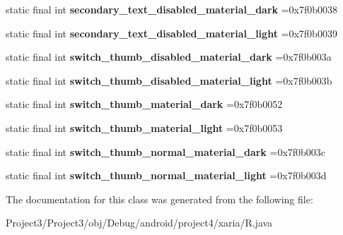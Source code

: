 \begin{DoxyCompactItemize}
static final int {\bfseries secondary\+\_\+text\+\_\+disabled\+\_\+material\+\_\+dark} =0x7f0b0038
\item 
\mbox{\label{classproject4_1_1xaria_1_1R_1_1color_aa8acd560167c8da622b855f6faadcd74}} 
static final int {\bfseries secondary\+\_\+text\+\_\+disabled\+\_\+material\+\_\+light} =0x7f0b0039
\item 
\mbox{\label{classproject4_1_1xaria_1_1R_1_1color_af5c1c168d6208d5efd3ebbaf8b90255c}} 
static final int {\bfseries switch\+\_\+thumb\+\_\+disabled\+\_\+material\+\_\+dark} =0x7f0b003a
\item 
\mbox{\label{classproject4_1_1xaria_1_1R_1_1color_ad959604f4ca8ac6d23ec45c8bb16be19}} 
static final int {\bfseries switch\+\_\+thumb\+\_\+disabled\+\_\+material\+\_\+light} =0x7f0b003b
\item 
\mbox{\label{classproject4_1_1xaria_1_1R_1_1color_ae33f71580a9b90cb476a54a52b7e0735}} 
static final int {\bfseries switch\+\_\+thumb\+\_\+material\+\_\+dark} =0x7f0b0052
\item 
\mbox{\label{classproject4_1_1xaria_1_1R_1_1color_a5ba0bf0ffa87e3e726a7028475bf8272}} 
static final int {\bfseries switch\+\_\+thumb\+\_\+material\+\_\+light} =0x7f0b0053
\item 
\mbox{\label{classproject4_1_1xaria_1_1R_1_1color_a484920813fb10b411435a888a4654517}} 
static final int {\bfseries switch\+\_\+thumb\+\_\+normal\+\_\+material\+\_\+dark} =0x7f0b003c
\item 
\mbox{\label{classproject4_1_1xaria_1_1R_1_1color_addc74ae014b59d1d5bfef8d6a05e8422}} 
static final int {\bfseries switch\+\_\+thumb\+\_\+normal\+\_\+material\+\_\+light} =0x7f0b003d
\end{DoxyCompactItemize}


The documentation for this class was generated from the following file\+:\begin{DoxyCompactItemize}
\item 
Project3/\+Project3/obj/\+Debug/android/project4/xaria/R.\+java\end{DoxyCompactItemize}
